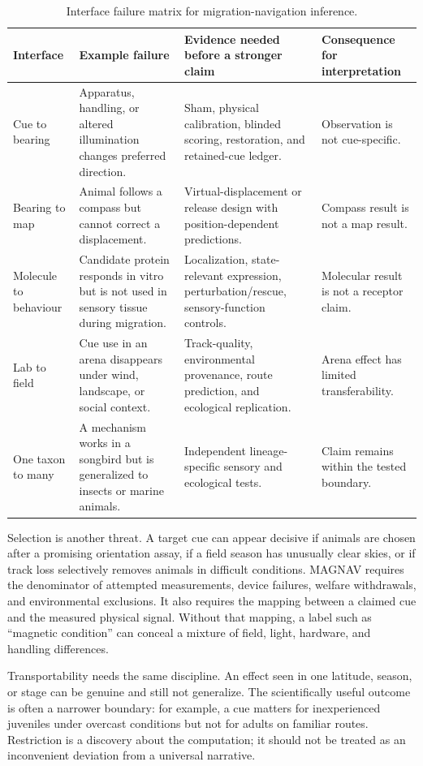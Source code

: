 \documentclass[conference]{IEEEtran}
\begin{document}
\begin{table}[!t]
\caption{Interface failure matrix for migration-navigation inference.}\label{tab:interfaces}\centering\footnotesize
\begin{tabular}{@{}L{.18\textwidth}L{.25\textwidth}L{.29\textwidth}L{.20\textwidth}@{}}\toprule
Interface & Example failure & Evidence needed before a stronger claim & Consequence for interpretation\\\midrule
Cue to bearing & Apparatus, handling, or altered illumination changes preferred direction. & Sham, physical calibration, blinded scoring, restoration, and retained-cue ledger. & Observation is not cue-specific.\\
Bearing to map & Animal follows a compass but cannot correct a displacement. & Virtual-displacement or release design with position-dependent predictions. & Compass result is not a map result.\\
Molecule to behaviour & Candidate protein responds in vitro but is not used in sensory tissue during migration. & Localization, state-relevant expression, perturbation/rescue, sensory-function controls. & Molecular result is not a receptor claim.\\
Lab to field & Cue use in an arena disappears under wind, landscape, or social context. & Track-quality, environmental provenance, route prediction, and ecological replication. & Arena effect has limited transferability.\\
One taxon to many & A mechanism works in a songbird but is generalized to insects or marine animals. & Independent lineage-specific sensory and ecological tests. & Claim remains within the tested boundary.\\\bottomrule
\end{tabular}
\end{table}

Selection is another threat. A target cue can appear decisive if animals are chosen after a promising orientation assay, if a field season has unusually clear skies, or if track loss selectively removes animals in difficult conditions. MAGNAV requires the denominator of attempted measurements, device failures, welfare withdrawals, and environmental exclusions. It also requires the mapping between a claimed cue and the measured physical signal. Without that mapping, a label such as ``magnetic condition'' can conceal a mixture of field, light, hardware, and handling differences.

Transportability needs the same discipline. An effect seen in one latitude, season, or stage can be genuine and still not generalize. The scientifically useful outcome is often a narrower boundary: for example, a cue matters for inexperienced juveniles under overcast conditions but not for adults on familiar routes. Restriction is a discovery about the computation; it should not be treated as an inconvenient deviation from a universal narrative.
\end{document}
